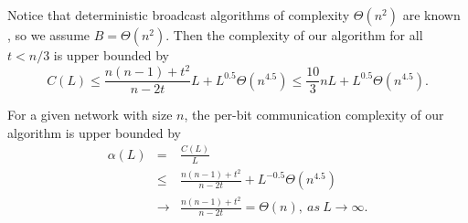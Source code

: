 \documentclass[12pt]{article}
\begin{document}
Notice that deterministic broadcast algorithms of complexity $\Theta(n^2)$ are known \cite{bit_optimal_89}, so we assume $B=\Theta(n^2)$. Then the complexity of our algorithm for all $t<n/3$ is upper bounded by
\begin{equation}
C(L) \le \frac{n(n-1)+t^2}{n-2t}L + L^{0.5}\Theta(n^{4.5}) \le \frac{10}{3} nL + L^{0.5}\Theta(n^{4.5}).
\end{equation}

For a given network with size $n$, the per-bit communication complexity of our algorithm is upper bounded by
\begin{eqnarray}
\alpha(L) &=& \frac{C(L)}{L} \\
&\le& \frac{n(n-1)+t^2}{n-2t} + L^{-0.5}\Theta(n^{4.5}) \\
&\rightarrow& \frac{n(n-1)+t^2}{n-2t} = \Theta(n),~as~L\rightarrow\infty.
\end{eqnarray}


 




\end{document}
